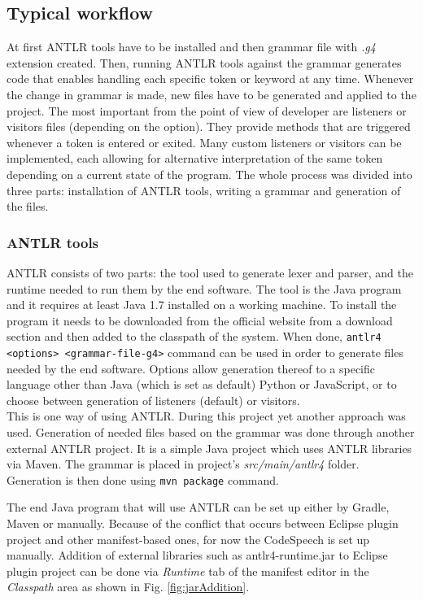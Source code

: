 \subsection{Typical workflow}

At first ANTLR tools have to be installed and then grammar file with \textit{.g4} extension created. Then, running ANTLR tools against the grammar generates code that enables handling each specific token or keyword at any time. Whenever the change in grammar is made, new files have to be generated and applied to the project. The most important from the point of view of developer are listeners or visitors files (depending on the option). They provide methods that are triggered whenever a token is entered or exited. Many custom listeners or visitors can be implemented, each allowing for alternative interpretation of the same token depending on a current state of the program. The whole process was divided into three parts: installation of ANTLR tools, writing a grammar and generation of the files.

\subsubsection{ANTLR tools}

ANTLR consists of two parts: the tool used to generate lexer and parser, and the runtime needed to run them by the end software. The tool is the Java program and it requires at least Java 1.7 installed on a working machine. To install the program it needs to be downloaded from the official website from a download section and then added to the classpath of the system. When done, \texttt{antlr4 <options> <grammar-file-g4>} command can be used in order to generate files needed by the end software. Options allow generation thereof to a specific language other than Java (which is set as default) \eg Python or JavaScript, or to choose between generation of listeners (default) or visitors. \\
This is one way of using ANTLR. During this project yet another approach was used. Generation of needed files based on the grammar was done through another external ANTLR project. It is a simple Java project which uses ANTLR libraries via Maven. The grammar is placed in project's \textit{src/main/antlr4} folder. Generation is then done using \texttt{mvn package} command. 

The end Java program that will use ANTLR can be set up either by Gradle, Maven or manually. Because of the conflict that occurs between Eclipse plugin project and other manifest-based ones, for now the CodeSpeech is set up manually. Addition of external libraries such as antlr4-runtime.jar to Eclipse plugin project can be done via \textit{Runtime} tab of the manifest editor in the \textit{Classpath} area as shown in Fig. \ref{fig:jarAddition}.


